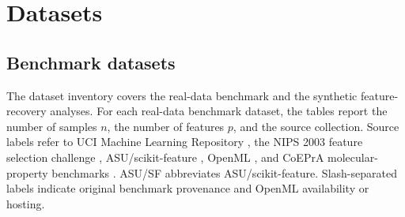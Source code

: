 \section{Datasets}
\label{app:dataset-inventory}

\subsection{Benchmark datasets}

The dataset inventory covers the real-data benchmark and the synthetic
feature-recovery analyses.
For each real-data benchmark dataset, the tables report the number of samples
$n$, the number of features $p$, and the source collection. Source labels refer
to UCI Machine Learning Repository \citep{KellyLongjohnNottinghamUCI}, the NIPS
2003 feature selection challenge \citep{Guyon2004NIPSFeatureSelectionChallenge},
ASU/scikit-feature \citep{Li2018FeatureSelectionDataPerspective}, OpenML
\citep{Vanschoren2014OpenML}, and CoEPrA molecular-property benchmarks
\citep{DemirKavuk2010CoeprA}. ASU/SF abbreviates ASU/scikit-feature.
Slash-separated labels indicate original benchmark provenance and OpenML
availability or hosting.

